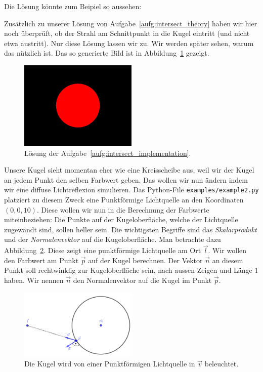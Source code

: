 \begin{losung*}
	Die Lösung könnte zum Beipiel so aussehen:
	
	Zusätzlich zu unserer Lösung von Aufgabe~\ref{aufg:intersect_theory} haben wir hier noch überprüft, ob der Strahl am Schnittpunkt in die Kugel eintritt (und nicht etwa austritt).
	Nur diese Lösung lassen wir zu.
	Wir werden später sehen, warum das nützlich ist.
	Das so generierte Bild ist in Abbildung~\ref{fig:solution_sphere} gezeigt.
	\begin{figure}[ht]
		\centering
		\includegraphics[width=0.5\textwidth]{images/example1.png}
		\caption{Lösung der Aufgabe~\ref{aufg:intersect_implementation}.}
		\label{fig:solution_sphere}
	\end{figure}
\end{losung*}
Unsere Kugel sieht momentan eher wie eine Kreisscheibe aus, weil wir der Kugel an jedem Punkt den selben Farbwert geben.
Das wollen wir nun ändern indem wir eine diffuse Lichtreflexion simulieren.
Das Python-File \texttt{examples/example2.py} platziert zu diesem Zweck eine Punktförmige Lichtquelle an den Koordinaten $(0,0,10)$.
Diese wollen wir nun in die Berechnung der Farbwerte miteinbeziehen:
Die Punkte auf der Kugeloberfläche, welche der Lichtquelle zugewandt sind, sollen heller sein.
Die wichtigsten Begriffe sind das \textit{Skalarprodukt} und der \textit{Normalenvektor} auf die Kugeloberfläche.
Man betrachte dazu Abbildung~\ref{fig:sphere_diffuse}.
Diese zeigt eine punktförmige Lichtquelle am Ort $\vec{l}$.
Wir wollen den Farbwert am Punkt $\vec{p}$ auf der Kugel berechnen.
Der Vektor $\vec{n}$ an diesem Punkt soll rechtwinklig zur Kugeloberfläche sein, nach aussen Zeigen und Länge $1$ haben.
Wir nennen $\vec{n}$ den Normalenvektor auf die Kugel im Punkt $\vec{p}$.
\begin{figure}[ht]
	\centering
	\includegraphics[width=0.5\textwidth]{images/sphere_diffuse.pdf}
	\caption{Die Kugel wird von einer Punktförmigen Lichtquelle in $\vec{v}$ beleuchtet.}
\label{fig:sphere_diffuse}
\end{figure}
